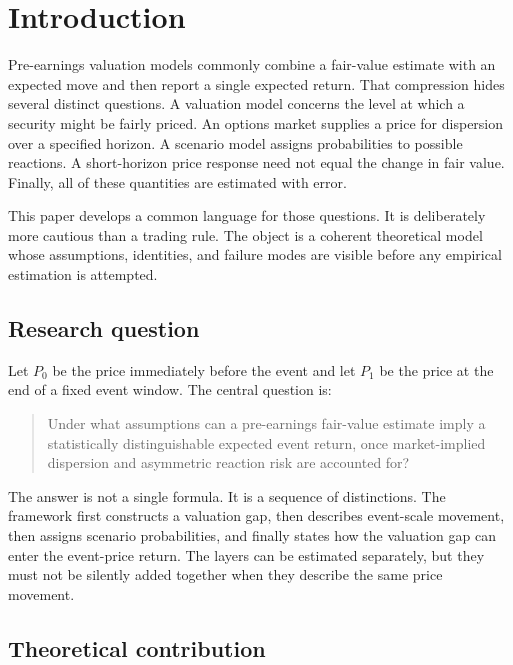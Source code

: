 \tableofcontents
\newpage

\section{Introduction}

Pre-earnings valuation models commonly combine a fair-value estimate with an
expected move and then report a single expected return. That compression hides
several distinct questions. A valuation model concerns the level at which a
security might be fairly priced. An options market supplies a price for
dispersion over a specified horizon. A scenario model assigns probabilities to
possible reactions. A short-horizon price response need not equal the change in
fair value. Finally, all of these quantities are estimated with error.

This paper develops a common language for those questions. It is deliberately
more cautious than a trading rule. The object is a coherent theoretical model
whose assumptions, identities, and failure modes are visible before any
empirical estimation is attempted.

\subsection{Research question}

Let $P_0$ be the price immediately before the event and let $P_1$ be the price
at the end of a fixed event window. The central question is:

\begin{quote}
Under what assumptions can a pre-earnings fair-value estimate imply a
statistically distinguishable expected event return, once market-implied
dispersion and asymmetric reaction risk are accounted for?
\end{quote}

The answer is not a single formula. It is a sequence of distinctions. The
framework first constructs a valuation gap, then describes event-scale movement,
then assigns scenario probabilities, and finally states how the valuation gap
can enter the event-price return. The layers can be estimated separately, but
they must not be silently added together when they describe the same price
movement.

\subsection{Theoretical contribution}

